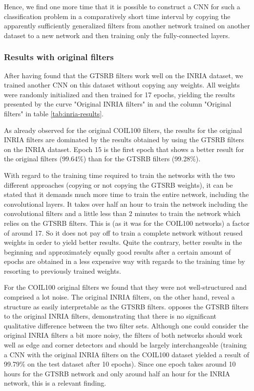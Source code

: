 \documentclass[11pt, a4paper]{article}
\begin{document}
Hence, we find one more time that it is possible to construct a CNN for such a classification problem in a comparatively short time interval by copying the apparently sufficiently generalized filters from another network trained on another dataset to a new network and then training only the fully-connected layers.

\subsubsection{Results with original filters}

After having found that the GTSRB filters work well on the INRIA dataset, we trained another CNN on this dataset without copying any weights. All weights were randomly initialized and then trained for 17 epochs, yielding the results presented by the curve "Original INRIA filters" in  and the column "Original filters" in table \ref{tab:inria-results}.

As already observed for the original COIL100 filters, the results for the original INRIA filters are dominated by the results obtained by using the GTSRB filters on the INRIA dataset. Epoch 15 is the first epoch that shows a better result for the original filters (99.64\%) than for the GTSRB filters (99.28\%).

With regard to the training time required to train the networks with the two different approaches (copying or not copying the GTSRB weights), it can be stated that it demands much more time to train the entire network, including the convolutional layers. It takes over half an hour to train the network including the convolutional filters and a little less than 2 minutes to train the network which relies on the GTSRB filters. This is (as it was for the COIL100 networks) a factor of around 17. So it does not pay off to train a complete network without reused weights in order to yield better results. Quite the contrary, better results in the beginning and approximately equally good results after a certain amount of epochs are obtained in a less expensive way with regards to the training time by resorting to previously trained weights.

For the COIL100 original filters we found that they were not well-structured and comprised a lot noise. The original INRIA filters, on the other hand, reveal a structure as easily interpretable as the GTSRB filters.  opposes the GTSRB filters to the original INRIA filters, demonstrating that there is no significant qualitative difference between the two filter sets. Although one could consider the original INRIA filters a bit more noisy, the filters of both networks should work well as edge and corner detectors and should be largely interchangeable (training a CNN with the original INRIA filters on the COIL100 dataset yielded a result of 99.79\% on the test dataset after 10 epochs). Since one epoch takes around 10 hours for the GTSRB network and only around half an hour for the INRIA network, this is a relevant finding.
\end{document}
